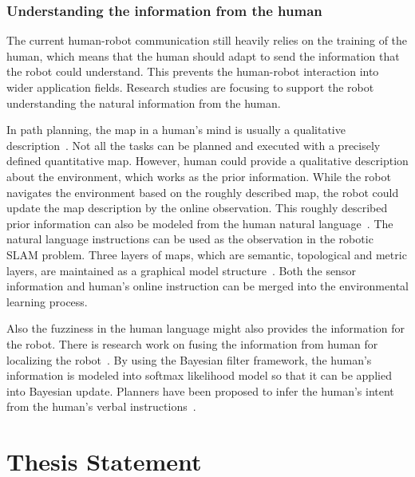 \documentclass[phd]{byuprop}
\begin{document}
\subsubsection{Understanding the information from the human}

The current human-robot communication still heavily relies on the training of the human, which means that the human should adapt to send the information that the robot could understand.
This prevents the human-robot interaction into wider application fields.
Research studies are focusing to support the robot understanding the natural information from the human.

In path planning, the map in a human's mind is usually a qualitative description~\cite{mcclelland2012qualitative,6425551,mcclelland2014qualitative,shah2013qualitative}.
Not all the tasks can be planned and executed with a precisely defined quantitative map.
However, human could provide a qualitative description about the environment, which works as the prior information.
While the robot navigates the environment based on the roughly described map, the robot could update the map description by the online observation.
This roughly described prior information can also be modeled from the human natural language~\cite{tellex2011understanding,walter2014framework}.
The natural language instructions can be used as the observation in the robotic SLAM problem.
Three layers of maps, which are semantic, topological and metric layers, are maintained as a graphical model structure~\cite{walter2014framework}.
Both the sensor information and human's online instruction can be merged into the environmental learning process.

Also the fuzziness in the human language might also provides the information for the robot.
There is research work on fusing the information from human for localizing the robot~\cite{6301744,5509521,ahmed2014enabling}.
By using the Bayesian filter framework, the human's information is modeled into softmax likelihood model so that it can be applied into Bayesian update.
Planners have been proposed to infer the human's intent from the human's verbal instructions~\cite{howard2014natural,Duvallet_2014_7795}.

\section{Thesis Statement}
\end{document}
